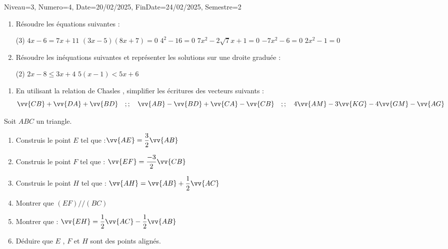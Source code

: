 \documentclass[a4paper,12pt]{article}
\begin{document}
\begin{Maquette}[DM]{Niveau=3, Numero=4, Date=20/02/2025, FinDate=24/02/2025, Semestre=2}

\begin{exercice}
\begin{enumerate}
\item Résoudre les équations suivantes :
\begin{tasks}(3)
\task $4x-6=7x+11$ 
\task $(3x-5)(8x+7)=0$ 
\task $4^{2}-16=0$ 
\task $7x^{2}-2\sqrt{7}x+1=0$ 
\task $-7x^{2}-6=0$
\task $2x^{2}-1=0$
\end{tasks}
\item Résoudre les inéquations suivantes et représenter les solutions sur une droite graduée :
\begin{tasks}(2)
\task $2x-8\leq 3x+4$ 
\task $5(x-1)< 5x+6$
\end{tasks}
\end{enumerate}
\end{exercice}

\begin{exercice}
\begin{enumerate}
\item En utilisant la relation de Chasles , simplifier les écritures des vecteurs suivants :
\[
\vv{CB}+\vv{DA}+\vv{BD}\quad ;;\quad
 \vv{AB}-\vv{BD}+\vv{CA}-\vv{CB}\quad ;;\quad
 4\vv{AM}-3\vv{KG}-4\vv{GM}-\vv{AG}
\]
\end{enumerate}
\end{exercice}

\begin{exercice}
Soit $ABC$ un triangle.
\begin{enumerate}
\item Construis le point $E$ tel que :$\vv{AE}=\dfrac{3}{2}\vv{AB}$
\item Construis le point $F$ tel que : $\vv{EF}=\dfrac{-3}{2}\vv{CB}$
\item Construis le point $H$ tel que : $\vv{AH}=\vv{AB}+\dfrac{1}{2}\vv{AC}$
\item Montrer que $(EF)//(BC)$
\item Montrer que : $\vv{EH}=\dfrac{1}{2}\vv{AC}-\dfrac{1}{2}\vv{AB}$
\item Déduire que $E$ , $F$ et $H$ sont des points alignés.
\end{enumerate}
\end{exercice}



\end{Maquette}
\end{document}
